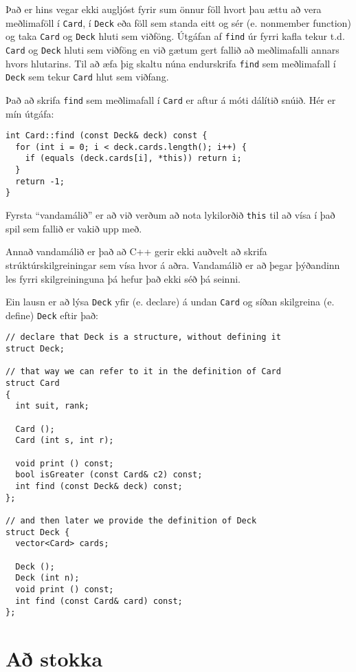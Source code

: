 Það er hins vegar ekki augljóst fyrir sum önnur föll hvort þau ættu að vera
meðlimaföll í {\tt Card}, í {\tt Deck} eða föll sem standa eitt og sér (e. nonmember function)
og taka {\tt Card} og {\tt Deck} hluti sem viðföng.
Útgáfan af {\tt find} úr fyrri kafla tekur t.d. {\tt Card} og {\tt Deck} hluti sem viðföng
en við gætum gert fallið að meðlimafalli annars hvors hlutarins. 
Til að æfa þig skaltu núna endurskrifa {\tt find} sem meðlimafall í {\tt Deck} sem tekur
{\tt Card} hlut sem viðfang. 

Það að skrifa {\tt find} sem meðlimafall í {\tt Card} er aftur á móti dálítið snúið.
Hér er mín útgáfa: 

\begin{verbatim}
int Card::find (const Deck& deck) const {
  for (int i = 0; i < deck.cards.length(); i++) {
    if (equals (deck.cards[i], *this)) return i;
  }
  return -1;
}
\end{verbatim}
%
Fyrsta ``vandamálið'' er að við verðum að nota lykilorðið {\tt this}
til að vísa í það spil sem fallið er vakið upp með.


Annað vandamálið er það að C++ gerir ekki auðvelt að skrifa strúktúrskilgreiningar
sem vísa hvor á aðra.
Vandamálið er að þegar þýðandinn les fyrri skilgreininguna þá hefur það ekki séð þá seinni.

Ein lausn er að lýsa {\tt Deck} yfir (e. declare) á undan {\tt Card} og síðan skilgreina (e. define) {\tt Deck} eftir það:

\begin{verbatim}
// declare that Deck is a structure, without defining it
struct Deck;

// that way we can refer to it in the definition of Card
struct Card
{
  int suit, rank;

  Card ();
  Card (int s, int r);

  void print () const;
  bool isGreater (const Card& c2) const;
  int find (const Deck& deck) const;
};

// and then later we provide the definition of Deck
struct Deck {
  vector<Card> cards;

  Deck ();
  Deck (int n);
  void print () const;
  int find (const Card& card) const;
};
\end{verbatim}


\section{Að stokka}
\label{shuffle}

